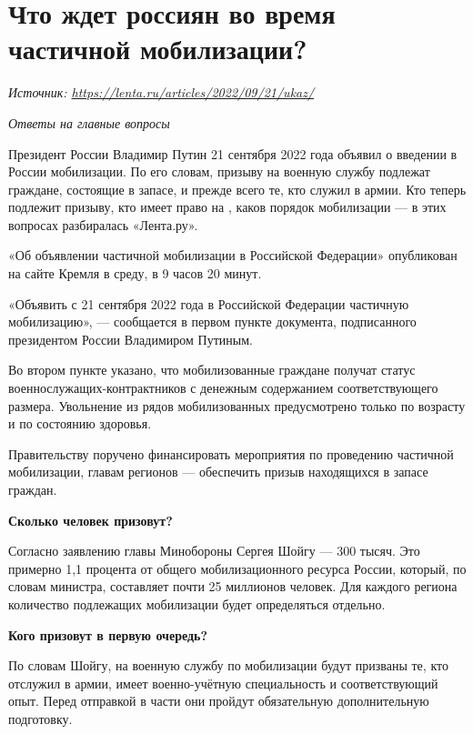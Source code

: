 
\section{Что ждет россиян во время частичной мобилизации?}
\textit{Источник: \url{https://lenta.ru/articles/2022/09/21/ukaz/}}

\textit{Ответы на главные вопросы}

Президент России Владимир Путин 21 сентября 2022 года объявил о введении в России  мобилизации. По его словам, призыву на военную службу подлежат граждане, состоящие в запасе, и прежде всего те, кто служил в армии. Кто теперь подлежит призыву, кто имеет право на , каков порядок мобилизации — в этих вопросах разбиралась «Лента.ру».

 «Об объявлении частичной мобилизации в Российской Федерации» опубликован на сайте Кремля в среду, в 9 часов 20 минут.

«Объявить с 21 сентября 2022 года в Российской Федерации частичную мобилизацию», — сообщается в первом пункте документа, подписанного президентом России Владимиром Путиным.

Во втором пункте указано, что мобилизованные граждане получат статус военнослужащих-контрактников с денежным содержанием соответствующего размера. Увольнение из рядов мобилизованных предусмотрено только по возрасту и по состоянию здоровья.

Правительству поручено финансировать мероприятия по проведению частичной мобилизации, главам регионов — обеспечить призыв находящихся в запасе граждан.

\textbf{Сколько человек призовут?}

Согласно заявлению главы Минобороны Сергея Шойгу — 300 тысяч. Это примерно 1,1 процента от общего мобилизационного ресурса России, который, по словам министра, составляет почти 25 миллионов человек. Для каждого региона количество подлежащих мобилизации будет определяться отдельно.

\textbf{Кого призовут в первую очередь?}

По словам Шойгу, на военную службу по мобилизации будут призваны те, кто отслужил в армии, имеет военно-учётную специальность и соответствующий опыт. Перед отправкой в части они пройдут обязательную дополнительную подготовку.

